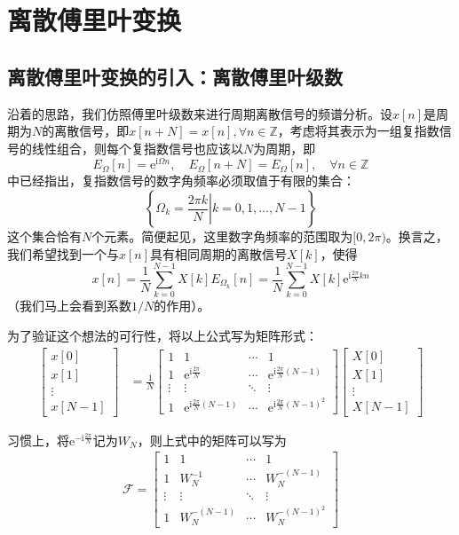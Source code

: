 \section{离散傅里叶变换}\label{sec:DFT}

\subsection{离散傅里叶变换的引入：离散傅里叶级数}\label{sub:intro_DFT}

沿着的思路，我们仿照傅里叶级数来进行周期离散信号的频谱分析。设$x[n]$是周期为$N$的离散信号，即$x[n+N]=x[n],\forall n\in\mathbb{Z}$，考虑将其表示为一组复指数信号的线性组合，则每个复指数信号也应该以$N$为周期，即
\[E_{\Omega}[n]=\mathrm{e}^{\mathrm{i}\Omega n},\quad E_{\Omega}[n+N]=E_{\Omega}[n],\quad \forall n\in\mathbb{Z}\]
中已经指出，复指数信号的数字角频率必须取值于有限的集合：
\[\left\{\left.\Omega_k=\frac{2\pi k}{N}\right|k=0,1,\dots,N-1\right\}\]
这个集合恰有$N$个元素。简便起见，这里数字角频率的范围取为$[0,2\pi)$。换言之，我们希望找到一个与$x[n]$具有相同周期的离散信号$X[k]$，使得
\[x[n]=\frac{1}{N}\sum_{k=0}^{N-1}X[k]E_{\Omega_k}[n]=\frac{1}{N}\sum_{k=0}^{N-1}X[k]\mathrm{e}^{\mathrm{i}\frac{2\pi}{N}kn}\]
（我们马上会看到系数$1/N$的作用）。

为了验证这个想法的可行性，将以上公式写为矩阵形式：
\begin{align*}
\begin{bmatrix}x[0]  \\
x[1]  \\
\vdots \\
x[N-1]
\end{bmatrix}&=\frac{1}{N}\begin{bmatrix}1 & 1 & \cdots & 1 \\
1 & \mathrm{e}^{\mathrm{i}\frac{2\pi}{N}} & \cdots & \mathrm{e}^{\mathrm{i}\frac{2\pi}{N}(N-1)} \\
\vdots & \vdots & \ddots & \vdots \\
1 & \mathrm{e}^{\mathrm{i}\frac{2\pi}{N}(N-1)} & \cdots & \mathrm{e}^{\mathrm{i}\frac{2\pi}{N}(N-1)^2}
\end{bmatrix}\begin{bmatrix}X[0]  \\
X[1]  \\
\vdots \\
X[N-1]
\end{bmatrix}
\end{align*}

习惯上，将$\mathrm{e}^{-\mathrm{i}\frac{2\pi}{N}}$记为$W_N$，则上式中的矩阵可以写为
\begin{align*}
    \mathcal{F} =\begin{bmatrix}1 & 1 & \cdots & 1 \\
        1 & W_N^{-1} & \cdots & W_N^{-(N-1)} \\
        \vdots & \vdots & \ddots & \vdots \\
        1 & W_N^{-(N-1)} & \cdots & W_N^{-(N-1)^2}
    \end{bmatrix}
\end{align*}

